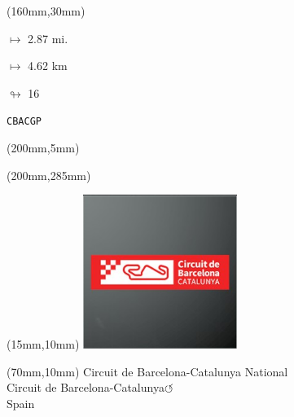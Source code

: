 \begin{textblock*}{40mm}(160mm,30mm)%
\Large
\par$\mapsto$ 2.87 mi.
\par$\mapsto$ 4.62 km
\par$\looparrowright$ 16
\par\hfill\tiny\tt CBACGP\\
\end{textblock*}
\begin{textblock*}{20mm}(200mm,5mm)%
\fbox{\thepage}
\label{CBACGP}
\end{textblock*}
\begin{textblock*}{20mm}(200mm,285mm)%
\fbox{\thepage}
\end{textblock*}

\null\newpage
\begin{textblock*}{50mm}(15mm,10mm)%
\includegraphics[width=50mm]{LG/2015-05-20_00078.png}
\end{textblock*}
\begin{textblock*}{130mm}(70mm,10mm)%
{\fontsize{20}{20}\selectfont Circuit de Barcelona-Catalunya National\\}
{\fontsize{16}{16}\selectfont Circuit de Barcelona-Catalunya\hfill \huge$\circlearrowleft$\\}
{\fontsize{12}{12}\selectfont Spain\\}
\end{textblock*}
